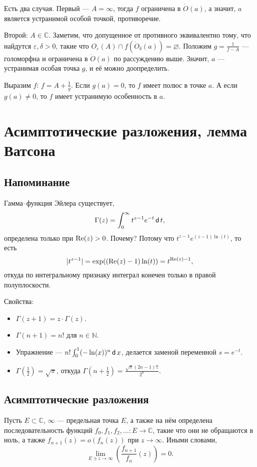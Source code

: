 Есть два случая. Первый --- $A = \infty$, тогда $f$ ограничена в $\dot O(a)$, а значит, $a$ является устранимой особой точкой, противоречие.

Второй: $A \in \mathbb C$. Заметим, что допущенное от противного эквивалентно тому, что найдутся $\varepsilon, \delta > 0$, такие что $O_{\varepsilon}(A) \cap f(\dot O_\delta(a)) = \varnothing$.
Положим $g = \frac{1}{f - A}$ --- голоморфна и ограничена в $\dot O(a)$ по рассуждению выше.
Значит, $a$ --- устранимая особая точка $g$, и её можно доопределить.

Выразим $f$: $f = A + \frac{1}{g}$.
Если $g(a) = 0$, то $f$ имеет полюс в точке $a$.
А если $g(a) \ne 0$, то $f$ имеет устранимую особенность в $a$.

\QED

\section{Асимптотические разложения, лемма Ватсона}
\subsection{Напоминание}
Гамма--функция Эйлера существует, 
\[
    \Gamma(z) = \int_0^\infty t^{z-1} e^{-t} \operatorname{\mathsf d} t,
\]
определена только при $\operatorname{Re}(z) > 0$.
Почему? Потому что $t^{z-1} e^{(z-1) \ln(t)}$, то есть
\[
    |t^{z-1}| = \exp((\operatorname{Re}(z) - 1) \ln(t)) = t^{\operatorname{Re}(z) - 1},
\]
откуда по интегральному признаку интеграл конечен только в правой полуплоскости.

Свойства:
\begin{itemize}
    \item $\Gamma(z + 1) = z \cdot \Gamma(z)$.
    \item $\Gamma(n + 1) = n!$ для $n \in \mathbb N$.
    \item Упражнение --- $n! \int_0^1 (-\ln(x))^n \operatorname{\mathsf d} x$, делается заменой переменной $s = e^{-t}$.
    \item $\Gamma(\frac{1}{2}) = \sqrt \pi$, откуда $\Gamma(n + \frac{1}{2}) = \frac{\sqrt \pi (2n - 1)!!}{2^n}$.
\end{itemize}

\subsection{Асимптотические разложения}
Пусть $E \subset \mathbb C$, $\infty$ --- предельная точка $E$, а также на нём определена последовательность функций $f_0, f_1, f_2, \dots: E \to \mathbb C$, такие что они не обращаются в ноль, а также $f_{n+1}(z) = o(f_n(z))$ при $z \to \infty$.
Иными словами,
\[
    \lim_{E \ni z \to \infty} \left( \frac{f_{n+1}}{f_n} (z) \right) = 0.
\]

